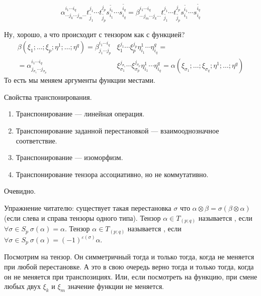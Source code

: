 \documentclass{article}
\begin{document}
\begin{itemize}
\begin{Proof}
\[            {\alpha}^{i_1\cdots i_q}_{\cdots j_k\cdots j_m\cdots}t^{j_1}_{\widetilde{j_1}}\cdots t^{j_p}_{\widetilde{j_p}}s_{i_1}^{\widetilde{i_1}}\cdots s_{i_q}^{\widetilde{i_q}}={\beta}^{i_1\cdots i_q}_{\cdots j_m\cdots j_k\cdots}t^{j_1}_{\widetilde{j_1}}\cdots t^{j_p}_{\widetilde{j_p}}s_{i_1}^{\widetilde{i_1}}\cdots s_{i_q}^{\widetilde{i_q}}
            \]
        \end{Proof}
        \begin{Proof}
            Ну, хорошо, а что происходит с тензором как с функцией?\\
            \[
            \begin{split}
                \beta(\xi_1;\ldots;\xi_p;\eta^1;\ldots;\eta^q)=\beta^{i_1\cdots i_q}_{j_1\cdots j_p}&\xi_1^{j_1}\cdots\xi_p^{j_p}\eta^1_{i_1}\cdots\eta^q_{i_q}=\\
                =\alpha^{i_1\cdots i_q}_{j_{\sigma_1}\cdots j_{\sigma_p}}&\xi_{\sigma_1}^{j_{\sigma_1}}\cdots\xi_{\sigma_p}^{j_{\sigma_p}}\eta^1_{i_1}\cdots\eta^q_{i_q}=\alpha(\xi_{\sigma_1};\ldots;\xi_{\sigma_q};\eta^1;\ldots;\eta^q)
            \end{split}
            \]
            То есть мы меняем аргументы функции местами.
        \end{Proof}
        \thm Свойства транспонирования.
        \begin{enumerate}
            \item Транспонирование --- линейная операция.
            \item Транспонирование заданной перестановкой --- взаимооднозначное соответствие.
            \item Транспонирование --- изоморфизм.
            \item Транспонирование тензора ассоциативно, но не коммутативно.
        \end{enumerate}
        \begin{Proof}
            Очевидно.
        \end{Proof}
        \thm Упражнение читателю: существует такая перестановка $\sigma$ что $\alpha\otimes\beta=\sigma(\beta\otimes\alpha)$ (если слева и справа тензоры одного типа).
        \dfn Тензор $\alpha\in T_{(p;q)}$ называется , если $\forall\sigma\in S_p~\sigma(\alpha)=\alpha$.
        \dfn Тензор $\alpha\in T_{(p;q)}$ называется , если $\forall\sigma\in S_p~\sigma(\alpha)=(-1)^{\varepsilon(\sigma)}\alpha$.
        \begin{Comment}
            Посмотрим на тензор. Он симметричный тогда и только тогда, когда не меняется при любой перестановке. А это в свою очередь верно тогда и только тогда, когда он не меняется при транспозициях. Или, если посмотреть на функцию, при смене любых двух $\xi_k$ и $\xi_m$ значение функции не меняется.\\

\end{Comment}
\end{itemize}
\end{document}
